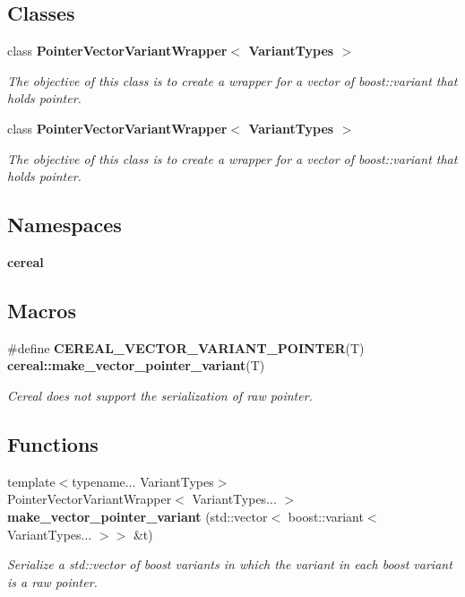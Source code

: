 \subsection*{Classes}
\begin{DoxyCompactItemize}
\item 
class \textbf{ Pointer\+Vector\+Variant\+Wrapper$<$ Variant\+Types $>$}
\begin{DoxyCompactList}\small\item\em The objective of this class is to create a wrapper for a vector of boost\+::variant that holds pointer. \end{DoxyCompactList}\item 
class \textbf{ Pointer\+Vector\+Variant\+Wrapper$<$ Variant\+Types $>$}
\begin{DoxyCompactList}\small\item\em The objective of this class is to create a wrapper for a vector of boost\+::variant that holds pointer. \end{DoxyCompactList}\end{DoxyCompactItemize}
\subsection*{Namespaces}
\begin{DoxyCompactItemize}
\item 
 \textbf{ cereal}
\end{DoxyCompactItemize}
\subsection*{Macros}
\begin{DoxyCompactItemize}
\item 
\#define \textbf{ C\+E\+R\+E\+A\+L\+\_\+\+V\+E\+C\+T\+O\+R\+\_\+\+V\+A\+R\+I\+A\+N\+T\+\_\+\+P\+O\+I\+N\+T\+ER}(T)~\textbf{ cereal\+::make\+\_\+vector\+\_\+pointer\+\_\+variant}(T)
\begin{DoxyCompactList}\small\item\em Cereal does not support the serialization of raw pointer. \end{DoxyCompactList}\end{DoxyCompactItemize}
\subsection*{Functions}
\begin{DoxyCompactItemize}
\item 
{\footnotesize template$<$typename... Variant\+Types$>$ }\\Pointer\+Vector\+Variant\+Wrapper$<$ Variant\+Types... $>$ \textbf{ make\+\_\+vector\+\_\+pointer\+\_\+variant} (std\+::vector$<$ boost\+::variant$<$ Variant\+Types... $>$$>$ \&t)
\begin{DoxyCompactList}\small\item\em Serialize a std\+::vector of boost variants in which the variant in each boost variant is a raw pointer. \end{DoxyCompactList}\end{DoxyCompactItemize}


